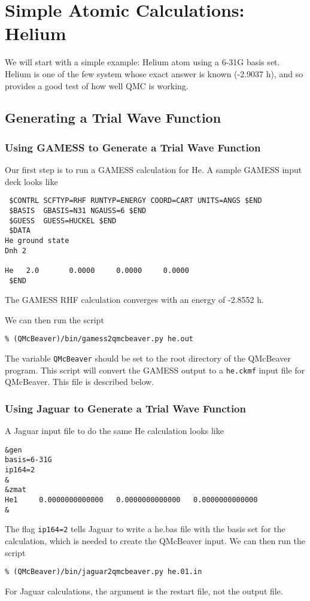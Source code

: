 \documentclass{article}
\begin{document}
\section{Simple Atomic Calculations: Helium}
We will start with a simple example: Helium atom using a 6-31G basis
set. Helium is one of the few system whose exact answer is known
(-2.9037 h), and so provides a good test of how well QMC is working.
\subsection{Generating a Trial Wave Function}
\subsubsection{Using GAMESS to Generate a Trial Wave Function}
Our first step is to run a GAMESS calculation for He. A sample GAMESS
input deck looks like
\begin{verbatim}
 $CONTRL SCFTYP=RHF RUNTYP=ENERGY COORD=CART UNITS=ANGS $END
 $BASIS  GBASIS=N31 NGAUSS=6 $END
 $GUESS  GUESS=HUCKEL $END
 $DATA
He ground state
Dnh 2

He   2.0       0.0000     0.0000     0.0000 
 $END
\end{verbatim}
The GAMESS RHF calculation converges with an energy of -2.8552 h.

We can then run the script 
\begin{verbatim}
% (QMcBeaver)/bin/gamess2qmcbeaver.py he.out
\end{verbatim}
The variable \verb-QMcBeaver- should be set to the root 
directory of the QMcBeaver program.  This script will convert the GAMESS
output to a \verb-he.ckmf- input file for QMcBeaver. This file is
described below. 

\subsubsection{Using Jaguar to Generate a Trial Wave Function}
A Jaguar input file to do the same He calculation looks like
\begin{verbatim}
&gen
basis=6-31G
ip164=2
&
&zmat
He1     0.0000000000000   0.0000000000000   0.0000000000000
&
\end{verbatim}

The flag \verb-ip164=2- tells Jaguar to write a he.bas file with the
basis set for the calculation, which is needed to create the QMcBeaver
input.  We can then run the script
\begin{verbatim}
% (QMcBeaver)/bin/jaguar2qmcbeaver.py he.01.in
\end{verbatim}
For Jaguar calculations, the argument is the restart file, not the
output file.
\end{document}
